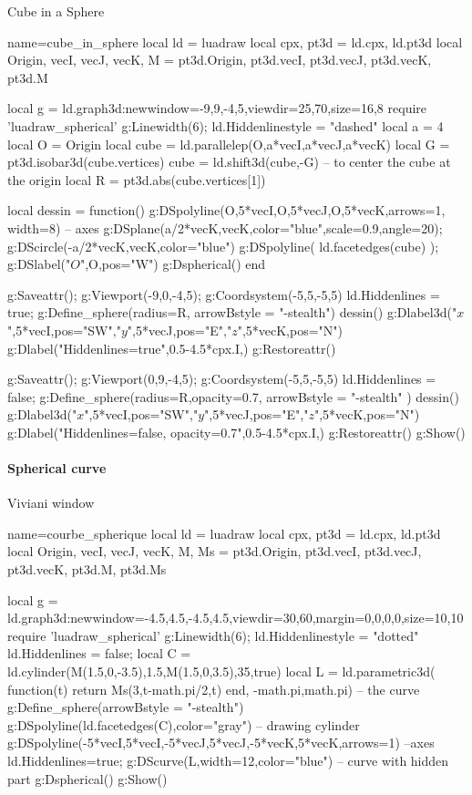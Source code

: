 \begin{demo}{Cube in a Sphere}
\begin{luadraw}{name=cube_in_sphere}
local ld = luadraw
local cpx, pt3d = ld.cpx, ld.pt3d
local Origin, vecI, vecJ, vecK, M = pt3d.Origin, pt3d.vecI, pt3d.vecJ, pt3d.vecK, pt3d.M

local g = ld.graph3d:new{window={-9,9,-4,5},viewdir={25,70},size={16,8}}
require 'luadraw_spherical'
g:Linewidth(6); ld.Hiddenlinestyle = "dashed"
local a = 4
local O = Origin
local cube = ld.parallelep(O,a*vecI,a*vecJ,a*vecK)
local G = pt3d.isobar3d(cube.vertices)
cube = ld.shift3d(cube,-G) -- to center the cube at the origin
local R = pt3d.abs(cube.vertices[1])

local dessin = function()
    g:DSpolyline({{O,5*vecI},{O,5*vecJ},{O,5*vecK}},{arrows=1, width=8}) -- axes
    g:DSplane({a/2*vecK,vecK},{color="blue",scale=0.9,angle=20}); 
    g:DScircle({-a/2*vecK,vecK},{color="blue"})
    g:DSpolyline( ld.facetedges(cube) ); g:DSlabel("$O$",O,{pos="W"})
    g:Dspherical()
end

g:Saveattr(); g:Viewport(-9,0,-4,5); g:Coordsystem(-5,5,-5,5)
ld.Hiddenlines = true; g:Define_sphere({radius=R, arrowBstyle = "-stealth"})
dessin()
g:Dlabel3d("$x$",5*vecI,{pos="SW"},"$y$",5*vecJ,{pos="E"},"$z$",5*vecK,{pos="N"})
g:Dlabel("Hiddenlines=true",0.5-4.5*cpx.I,{})
g:Restoreattr()

g:Saveattr(); g:Viewport(0,9,-4,5); g:Coordsystem(-5,5,-5,5)
ld.Hiddenlines = false; g:Define_sphere({radius=R,opacity=0.7, arrowBstyle = "-stealth"} )
dessin()
g:Dlabel3d("$x$",5*vecI,{pos="SW"},"$y$",5*vecJ,{pos="E"},"$z$",5*vecK,{pos="N"})
g:Dlabel("Hiddenlines=false, opacity=0.7",0.5-4.5*cpx.I,{})
g:Restoreattr()
g:Show()
\end{luadraw}
\end{demo}

\paragraph{Spherical curve}

\begin{demo}{Viviani window}
\begin{luadraw}{name=courbe_spherique}
local ld = luadraw
local cpx, pt3d = ld.cpx, ld.pt3d
local Origin, vecI, vecJ, vecK, M, Ms = pt3d.Origin, pt3d.vecI, pt3d.vecJ, pt3d.vecK, pt3d.M, pt3d.Ms

local g = ld.graph3d:new{window={-4.5,4.5,-4.5,4.5},viewdir={30,60},margin={0,0,0,0},size={10,10}}
require 'luadraw_spherical'
g:Linewidth(6); ld.Hiddenlinestyle = "dotted"
ld.Hiddenlines = false; 
local C = ld.cylinder(M(1.5,0,-3.5),1.5,M(1.5,0,3.5),35,true)
local L = ld.parametric3d( function(t) return Ms(3,t-math.pi/2,t) end, -math.pi,math.pi) -- the curve
g:Define_sphere({arrowBstyle = "-stealth"})
g:DSpolyline(ld.facetedges(C),{color="gray"}) -- drawing cylinder
g:DSpolyline({{-5*vecI,5*vecI},{-5*vecJ,5*vecJ},{-5*vecK,5*vecK}},{arrows=1}) --axes
ld.Hiddenlines=true; g:DScurve(L,{width=12,color="blue"}) -- curve with hidden part
g:Dspherical()
g:Show()
\end{luadraw}
\end{demo}

